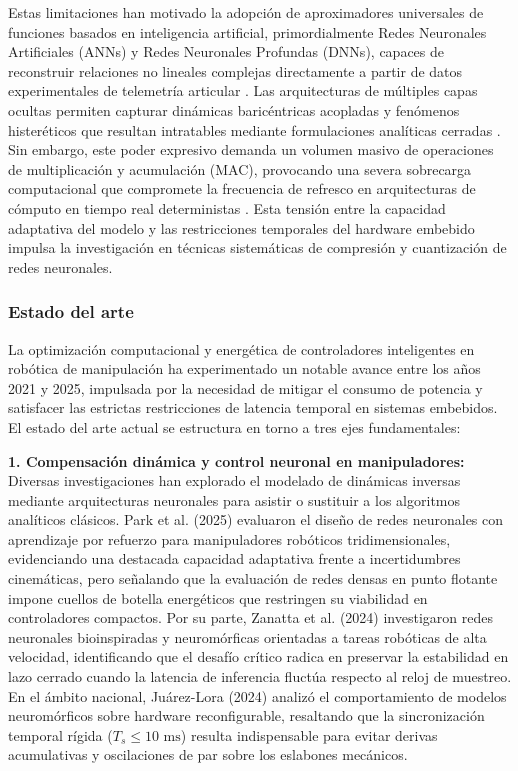 \documentclass[12pt]{article}
\begin{document}
Estas limitaciones han motivado la adopción de aproximadores universales de funciones basados en inteligencia artificial, primordialmente Redes Neuronales Artificiales (ANNs) y Redes Neuronales Profundas (DNNs), capaces de reconstruir relaciones no lineales complejas directamente a partir de datos experimentales de telemetría articular \cite{Park2025electronics, Zanatta2024exploring}. Las arquitecturas de múltiples capas ocultas permiten capturar dinámicas baricéntricas acopladas y fenómenos histeréticos que resultan intratables mediante formulaciones analíticas cerradas \cite{Zanatta2024exploring, JuarezLora2024Thesis}. Sin embargo, este poder expresivo demanda un volumen masivo de operaciones de multiplicación y acumulación (MAC), provocando una severa sobrecarga computacional que compromete la frecuencia de refresco en arquitecturas de cómputo en tiempo real deterministas \cite{Chen2021memristor, deVriesGao2025AIenergy, Kudithipudi2025scale}. Esta tensión entre la capacidad adaptativa del modelo y las restricciones temporales del hardware embebido impulsa la investigación en técnicas sistemáticas de compresión y cuantización de redes neuronales.

\subsubsection*{Estado del arte}
La optimización computacional y energética de controladores inteligentes en robótica de manipulación ha experimentado un notable avance entre los años 2021 y 2025, impulsada por la necesidad de mitigar el consumo de potencia y satisfacer las estrictas restricciones de latencia temporal en sistemas embebidos. El estado del arte actual se estructura en torno a tres ejes fundamentales:

\textbf{1. Compensación dinámica y control neuronal en manipuladores:} 
Diversas investigaciones han explorado el modelado de dinámicas inversas mediante arquitecturas neuronales para asistir o sustituir a los algoritmos analíticos clásicos. Park et al. (2025) \cite{Park2025electronics} evaluaron el diseño de redes neuronales con aprendizaje por refuerzo para manipuladores robóticos tridimensionales, evidenciando una destacada capacidad adaptativa frente a incertidumbres cinemáticas, pero señalando que la evaluación de redes densas en punto flotante impone cuellos de botella energéticos que restringen su viabilidad en controladores compactos. Por su parte, Zanatta et al. (2024) \cite{Zanatta2024exploring} investigaron redes neuronales bioinspiradas y neuromórficas orientadas a tareas robóticas de alta velocidad, identificando que el desafío crítico radica en preservar la estabilidad en lazo cerrado cuando la latencia de inferencia fluctúa respecto al reloj de muestreo. En el ámbito nacional, Juárez-Lora (2024) \cite{JuarezLora2024Thesis} analizó el comportamiento de modelos neuromórficos sobre hardware reconfigurable, resaltando que la sincronización temporal rígida ($T_s \le 10\text{ ms}$) resulta indispensable para evitar derivas acumulativas y oscilaciones de par sobre los eslabones mecánicos.
\end{document}
